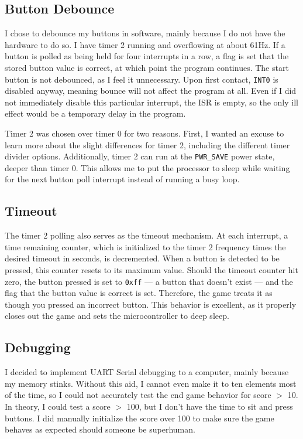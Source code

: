 \documentclass[11pt]{article}
\begin{document}
\subsection{Button Debounce}
I chose to debounce my buttons in software, mainly because I do not have the hardware 
to do so. I have timer 2 running and overflowing at about 61\si{\hertz}. If a button is 
polled as being held for four interrupts in a row, a flag is set that the stored button 
value is correct, at which point the program continues. The start button is not 
debounced, as I feel it unnecessary. Upon first contact, \texttt{INT0} is disabled 
anyway, meaning bounce will not affect the program at all. Even if I did not immediately 
disable this particular interrupt, the ISR is empty, so the only ill effect would 
be a temporary delay in the program.

Timer 2 was chosen over timer 0 for two reasons. First, I wanted an excuse to 
learn more about the slight differences for timer 2, including the different 
timer divider options. Additionally, timer 2 can run at the \texttt{PWR\_SAVE} 
power state, deeper than timer 0. This allows me to put the processor to sleep 
while waiting for the next button poll interrupt instead of running a busy 
loop.

\subsection{Timeout}
The timer 2 polling also serves as the timeout mechanism. At each interrupt, a 
time remaining counter, which is initialized to the timer 2 frequency times the 
desired timeout in seconds, is decremented. When a button is detected to be 
pressed, this counter resets to its maximum value. Should the timeout counter 
hit zero, the button pressed is set to \texttt{0xff} --- a button that doesn't 
exist --- and the flag that the button value is correct is set. Therefore, 
the game treats it as though you pressed an incorrect button. This behavior is 
excellent, as it properly closes out the game and sets the microcontroller to 
deep sleep.

\subsection{Debugging}
I decided to implement UART Serial debugging to a computer, mainly because my 
memory stinks. Without this aid, I cannot even make it to ten elements most of 
the time, so I could not accurately test the end game behavior for score $>$ 10. 
In theory, I could test a score $>$ 100, but I don't have the time to sit and 
press buttons. I did manually initialize the score over 100 to make sure the game 
behaves as expected should someone be superhuman.
\end{document}
